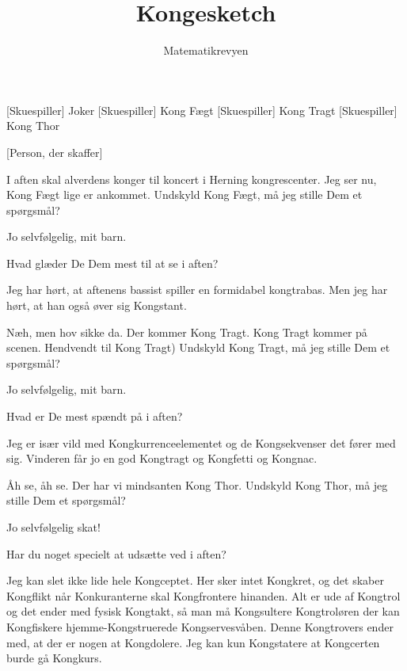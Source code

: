 \documentclass[a4paper,11pt]{article}
\title{Kongesketch}
\author{Matematikrevyen}
\begin{document}
\maketitle

\begin{roles}
[Skuespiller] Joker
[Skuespiller] Kong Fægt
[Skuespiller] Kong Tragt
[Skuespiller] Kong Thor
\end{roles}

\begin{props}
[Person, der skaffer]
\end{props}

\begin{sketch}


 I aften skal alverdens konger til koncert i Herning kongrescenter. Jeg ser nu, Kong Fægt lige er ankommet.  Undskyld Kong Fægt, må jeg stille Dem et spørgsmål?

 Jo selvfølgelig, mit barn.

 Hvad glæder De Dem mest til at se i aften?

 Jeg har hørt, at aftenens bassist spiller en formidabel kongtrabas. Men jeg har hørt, at han også øver sig Kongstant.


 Næh, men hov sikke da. Der kommer Kong Tragt. Kong Tragt kommer på scenen. Hendvendt til Kong Tragt) Undskyld Kong Tragt, må jeg stille Dem et spørgsmål?

 Jo selvfølgelig, mit barn.

 Hvad er De mest spændt på i aften?

 Jeg er især vild med Kongkurrenceelementet og de Kongsekvenser det fører med sig. Vinderen får jo en god Kongtragt og Kongfetti og Kongnac.


 Åh se, åh se. Der har vi mindsanten Kong Thor.  Undskyld Kong Thor, må jeg stille Dem et spørgsmål?

 Jo selvfølgelig skat!

 Har du noget specielt at udsætte ved i aften?

 Jeg kan slet ikke lide hele Kongceptet. Her sker intet Kongkret, og det skaber Kongflikt når Konkuranterne skal Kongfrontere hinanden. Alt er ude af Kongtrol og det ender med fysisk Kongtakt, så man må Kongsultere Kongtroløren der kan Kongfiskere hjemme-Kongstruerede Kongservesvåben. Denne Kongtrovers ender med, at der er nogen at Kongdolere. Jeg kan kun Kongstatere at Kongcerten burde gå Kongkurs.

\end{sketch}
\end{document}
